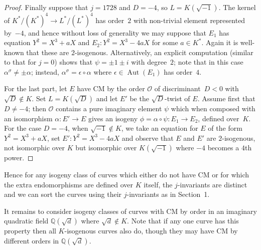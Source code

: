 \documentclass{article}
\def\Q{{\mathbb Q}}
\def\OO{{\mathcal O}}
\DeclareMathOperator{\Aut}{Aut}
\begin{document}
\begin{proof}
Finally suppose that $j=1728$ and $D=-4$, so $L=K(\sqrt{-1})$.  The
kernel of $K^*/(K^*)^4 \to L^*/(L^*)^4$ has order~$2$ with non-trivial
element represented by~$-4$, and hence without loss of generality we
may suppose that $E_1$ has equation $Y^2=X^3+aX$ and $E_2:
Y^2=X^3-4aX$ for some $a\in K^*$.  Again it is well-known that these
are $2$-isogenous.  Alternatively, an explicit computation (similar to
that for $j=0$) shows that $\psi=\pm1\pm i$ with degree~$2$; note that
in this case $\alpha^{\sigma}\not=\pm\alpha$; instead,
$\alpha^{\sigma}=\epsilon\circ\alpha$ where $\epsilon\in\Aut(E_1)$ has
order~$4$.

For the last part, let $E$ have CM by the order $\OO$ of
discriminant~$D<0$ with $\sqrt{D}\notin K$.  Set $L=K(\sqrt{D})$ and
let $E'$ be the $\sqrt{D}$-twist of $E$.  Assume first that
$D\not=-4$; then $\OO$ contains a pure imaginary element $\psi$ which
when composed with an isomorphism $\alpha:E'\to E$ gives an isogeny
$\phi=\alpha\circ\psi:E_1\to E_2$, defined over~$K$.  For the case
$D=-4$, when $\sqrt{-1}\notin K$, we take an equation for $E$ of the
form $Y^2=X^3+aX$, set $E': Y^2=X^3-4aX$ and observe that $E$ and $E'$
are $2$-isogenous, not isomorphic over $K$ but isomorphic over
$K(\sqrt{-1})$ where $-4$ becomes a $4$th power.

\end{proof}

Hence for any isogeny class of curves which either do not have CM or
for which the extra endomorphisms are defined over $K$ itself, the
$j$-invariants are distinct and we can sort the curves using their
$j$-invariants as in Section~1.

It remains to consider isogeny classes of curves with CM by order in
an imaginary quadratic field $\Q(\sqrt{d})$ where $\sqrt{d}\notin K$.
Note that if any one curve has this property then all $K$-isogenous
curves also do, though they may have CM by different orders in
$\Q(\sqrt{d})$.
\end{document}
